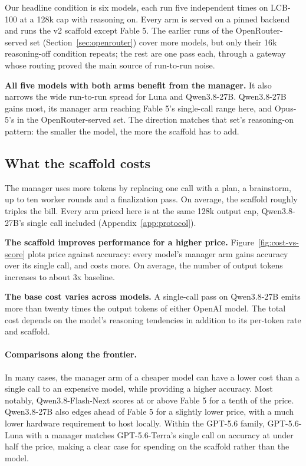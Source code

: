 \documentclass{article}
\begin{document}
Our headline condition is six models, each run five independent times on LCB-100 at a 128k
cap with reasoning on. Every arm is served on a pinned backend and runs the v2 scaffold except Fable 5. The
earlier runs of the OpenRouter-served set (Section~\ref{sec:openrouter}) cover more models,
but only their 16k reasoning-off condition repeats; the rest are one pass each, through a
gateway whose routing proved the main source of run-to-run noise.

\textbf{All five models with both arms benefit from the manager.} It also narrows
the wide run-to-run spread for Luna and Qwen3.8-27B. Qwen3.8-27B gains most, its manager arm
reaching Fable 5's single-call range here, and Opus-5's in the OpenRouter-served set. The
direction matches that set's reasoning-on pattern: the smaller the model, the more the
scaffold has to add.

\subsection{What the scaffold costs} 
\label{sec:cost}

The manager uses more tokens by replacing one call
with a plan, a brainstorm, up to ten worker rounds and a finalization pass. On average, the scaffold roughly triples the bill. Every arm
priced here is at the same 128k output cap, Qwen3.8-27B's single call included
(Appendix~\ref{app:protocol}).





\textbf{The scaffold improves performance for a higher price.}
Figure~\ref{fig:cost-vs-score} plots price against accuracy: every model's manager arm gains accuracy over its single
call, and costs more. On average, the number of output tokens increases to about 3x baseline.
 
\textbf{The base cost varies across models.} A single-call pass on Qwen3.8-27B emits more
than twenty times the output tokens of either OpenAI model. The total cost depends on the model's reasoning tendencies in addition to its per-token rate and scaffold.

\paragraph{Comparisons along the frontier.}
In many cases, the manager arm of a cheaper model can have a lower cost than a single call to an expensive model, while providing a higher accuracy. Most notably, Qwen3.8-Flash-Next scores at or above Fable 5 for a tenth of the price. Qwen3.8-27B also edges ahead of Fable 5 for a slightly lower price, with a much lower hardware requirement to host locally. Within the GPT-5.6 family, GPT-5.6-Luna with a manager matches GPT-5.6-Terra’s single call on accuracy at under half the price, making a clear case for spending on the scaffold rather than the model.
\end{document}
